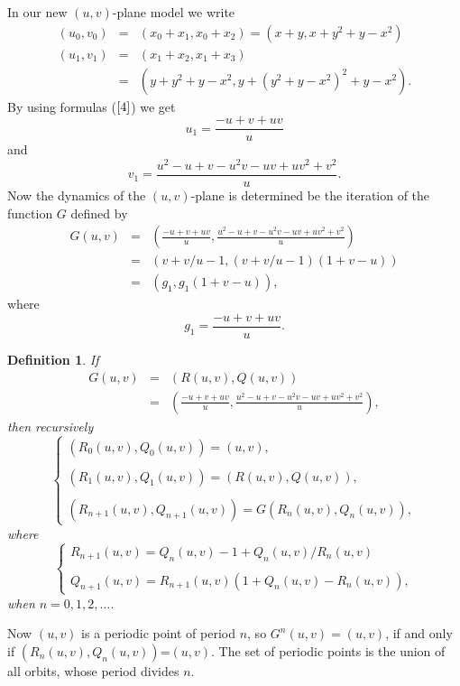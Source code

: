 \documentclass[12pt,a4paper]{amsart}
\newtheorem{maar}[lause]{Definition}
\numberwithin{equation}{section}
\numberwithin{lause}{section}
\begin{document}
In our new $(u,v)$-plane model we write
\begin{eqnarray*}
(u_{0},v_{0}) &=& (x_{0}+x_{1},x_{0}+x_{2})=(x+y,x+y^{2}+y-x^{2})\\
(u_{1},v_{1}) &=& (x_{1}+x_{2},x_{1}+x_{3}) \\
 &=& (y+y^{2}+y-x^{2},y+(y^{2}+y-x^{2})^{2}+y-x^{2}).
\end{eqnarray*}
By using formulas ($\ref{4}$) we get
\begin{displaymath}
u_{1}=\frac{-u+v+uv}{u}
\end{displaymath}
and
\begin{displaymath}
v_{1}=\frac{u^{2}-u+v-u^{2}v-uv+uv^{2}+v^{2}}{u}.
\end{displaymath}
Now the dynamics of the $(u,v)$-plane is determined be the iteration of the function $G$ defined by
\begin{eqnarray*}
 G(u,v)&=&\left(\frac{-u+v+uv}{u},\frac{u^2-u+v-u^2v-uv+uv^2+v^2}{u}\right) \\
 &=&(v+v/u-1,(v+v/u-1)(1+v-u)) \\
 &=&(g_{1},g_{1}(1+v-u)),
\end{eqnarray*}
where
\begin{displaymath}
g_{1}=\frac{-u+v+uv}{u}.
\end{displaymath}
\begin{maar}
If
\begin{eqnarray*}
G(u,v)&=&(R(u,v),Q(u,v)) \\
&=&\left(\frac{-u+v+uv}{u},\frac{u^2-u+v-u^2v-uv+uv^2+v^2}{u}\right),
\end{eqnarray*}
then recursively
\begin{equation}
\left\{\begin{array}{l}
      (R_{0}(u,v),Q_{0}(u,v))=(u,v), \\ \\
      (R_{1}(u,v),Q_{1}(u,v))=(R(u,v),Q(u,v)), \\ \\
      (R_{n+1}(u,v),Q_{n+1}(u,v))=G(R_{n}(u,v),Q_{n}(u,v)),\label{5}
\end{array}\right.
\end{equation}
where
\begin{equation}
\left\{\begin{array}{l}
      R_{n+1}(u,v)=Q_{n}(u,v)-1+Q_{n}(u,v)/R_{n}(u,v) \\ \\
      Q_{n+1}(u,v)=R_{n+1}(u,v)(1+Q_{n}(u,v)-R_{n}(u,v)),\label{6}
\end{array}\right.
\end{equation}
when $n=0,1,2,\ldots$.
\end{maar}
 Now $(u,v)$ is a periodic point of period $n$, so $G^{n}(u,v)=(u,v)$, if and only if $(R_{n}(u,v),Q_{n}(u,v))$=$(u,v)$. The set of periodic points is the union of all orbits, whose period divides $n$.
\end{document}
